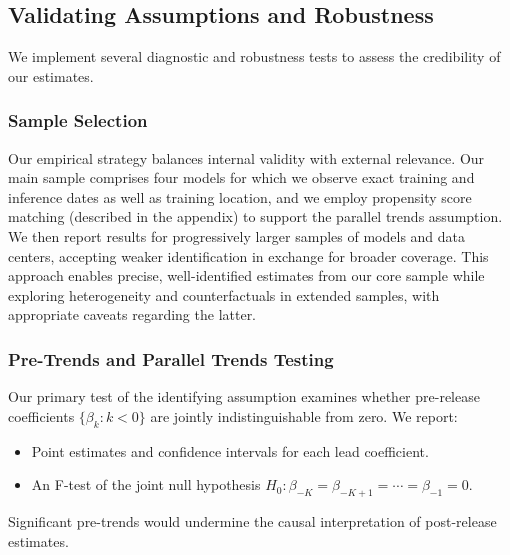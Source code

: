 \documentclass[sigconf,authordraft]{acmart}
\begin{document}
\subsection{Validating Assumptions and Robustness}
\label{subsec:robustness}

We implement several diagnostic and robustness tests to assess the credibility of our estimates.

\subsubsection{Sample Selection}

Our empirical strategy balances internal validity with external relevance. Our main sample comprises four models for which we observe exact training and inference dates as well as training location, and we employ propensity score matching (described in the appendix) to support the parallel trends assumption. We then report results for progressively larger samples of models and data centers, accepting weaker identification in exchange for broader coverage. This approach enables precise, well-identified estimates from our core sample while exploring heterogeneity and counterfactuals in extended samples, with appropriate caveats regarding the latter.


\subsubsection{Pre-Trends and Parallel Trends Testing}

Our primary test of the identifying assumption examines whether pre-release coefficients $\{\beta_k : k < 0\}$ are jointly indistinguishable from zero. We report:
\begin{itemize}
    \item Point estimates and confidence intervals for each lead coefficient.
    \item An F-test of the joint null hypothesis $H_0: \beta_{-K} = \beta_{-K+1} = \cdots = \beta_{-1} = 0$.
\end{itemize}
Significant pre-trends would undermine the causal interpretation of post-release estimates.
\end{document}
